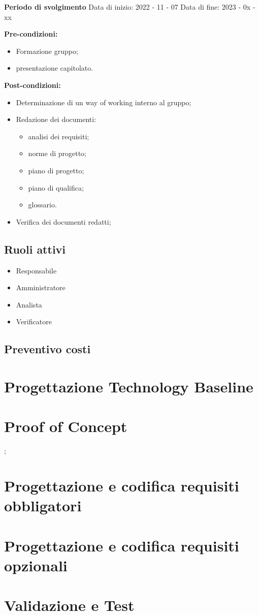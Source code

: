 \textbf{Periodo di svolgimento}
Data di inizio: 2022 - 11 - 07 
Data di fine: 2023 - 0x - xx

\textbf{Pre-condizioni:}
\begin{itemize}
    \item Formazione gruppo;
    \item presentazione capitolato.
\end{itemize}

\textbf{Post-condizioni:}
    \begin{itemize}
        \item Determinazione di un way of working interno al gruppo;
        \item Redazione dei documenti:
        \begin{itemize}
            \item analisi dei requisiti;
            \item norme di progetto;
            \item piano di progetto;
            \item piano di qualifica;
            \item glossario.
        \end{itemize}
        \item Verifica dei documenti redatti;
    \end{itemize}

\subsection{Ruoli attivi}
\begin{itemize}
    \item Responsabile
    \item Amministratore
    \item Analista
    \item Verificatore
\end{itemize}

\subsection{Preventivo costi}

\section{Progettazione Technology Baseline}

\section{Proof of Concept};

\section{Progettazione e codifica requisiti obbligatori}

\section{Progettazione e codifica requisiti opzionali}

\section{Validazione e Test}